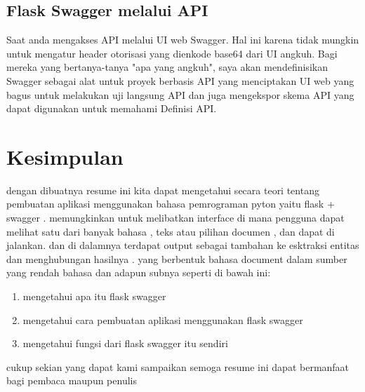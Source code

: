 \documentclass[12pt]{article}
\begin{document}
\subsection{Flask Swagger melalui API}
Saat anda mengakses API melalui UI web Swagger. Hal ini karena tidak mungkin untuk mengatur header otorisasi yang dienkode base64 dari UI angkuh. Bagi mereka yang bertanya-tanya "apa yang angkuh", saya akan mendefinisikan Swagger sebagai alat untuk proyek berbasis API yang menciptakan UI web yang bagus untuk melakukan uji langsung API dan juga mengekspor skema API yang dapat digunakan untuk memahami Definisi API.


\section{Kesimpulan}
dengan dibuatnya resume ini kita dapat mengetahui secara teori tentang pembuatan aplikasi menggunakan bahasa pemrograman pyton yaitu flask + swagger . 
memungkinkan untuk melibatkan interface di mana pengguna dapat melihat satu dari banyak bahasa , teks atau pilihan documen , dan dapat di jalankan. dan di dalamnya terdapat output sebagai tambahan ke esktraksi entitas dan menghubungan hasilnya . yang berbentuk bahasa document dalam sumber yang rendah bahasa dan adapun subnya seperti di bawah ini:

\begin{enumerate}
\item mengetahui apa itu flask swagger
\item mengetahui cara pembuatan aplikasi menggunakan flask swagger
\item mengetahui fungsi dari flask swagger itu sendiri
\end{enumerate}	
cukup sekian yang dapat kami sampaikan semoga resume ini dapat bermanfaat  bagi pembaca maupun penulis 
\end{document}
